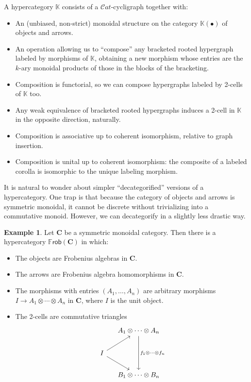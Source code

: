 \documentclass{article}
\theoremstyle{definition}
\newtheorem{eg}[thm]{Example}
\theoremstyle{remark}
\def\K{\mathbb{K}}
\def\frob{\mathbb{F}\mathsf{rob}}
\def\Cat{\ensuremath{\mathcal{C}\mathit{at}}}
\def\bC{\ensuremath{\mathbf{C}}\xspace}
\begin{document}
A hypercategory $\K$ consists of a $\Cat$-cycligraph together with:
\begin{itemize}
\item An (unbiased, non-strict) monoidal structure on the category $\K(\bullet)$ of objects and arrows.
\item An operation allowing us to ``compose'' any bracketed rooted hypergraph labeled by morphisms of $\K$, obtaining a new morphism whose entries are the $k$-ary monoidal products of those in the blocks of the bracketing.
\item Composition is functorial, so we can compose hypergraphs labeled by 2-cells of $\K$ too.
\item Any weak equivalence of bracketed rooted hypergraphs induces a 2-cell in $\K$ in the opposite direction, naturally.
\item Composition is associative up to coherent isomorphism, relative to graph insertion.
\item Composition is unital up to coherent isomorphism: the composite of a labeled corolla is isomorphic to the unique labeling morphism.
\end{itemize}

It is natural to wonder about simpler ``decategorified'' versions of a hypercategory.
One trap is that because the category of objects and arrows is symmetric monoidal, it cannot be discrete without trivializing into a commutative monoid.
However, we can decategorify in a slightly less drastic way.

\begin{eg}
  Let \bC be a symmetric monoidal category.
  Then there is a hypercategory $\frob(\bC)$ in which:
  \begin{itemize}
  \item The objects are Frobenius algebras in \bC.
  \item The arrows are Frobenius algebra homomorphisms in \bC.
  \item The morphisms with entries $(A_1,\dots,A_n)$ are arbitrary morphisms $I \to A_1\otimes\cdots\otimes A_n$ in \bC, where $I$ is the unit object.
  \item The 2-cells are commutative triangles
    \[
    \begin{tikzcd}[column sep=small]
      & A_1\otimes\cdots\otimes A_n \ar[dd,"f_1\otimes\cdots\otimes f_n"] \\
      I \ar[ur] \ar[dr] \\
      & B_1\otimes\cdots\otimes B_n
    \end{tikzcd}
    \]
  \end{itemize}
\end{eg}
\end{document}

